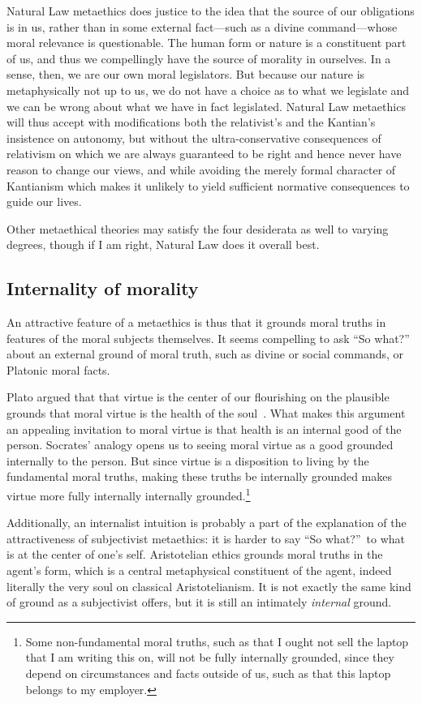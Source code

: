 Natural Law metaethics does justice to the idea that the source of our obligations is in us, rather than in some external fact---such as
a divine command---whose moral relevance is questionable. 
The human form or nature is a constituent part of us, and thus we compellingly have the source of morality in ourselves.
In a sense, then, we are our own moral legislators. But because our nature is metaphysically not
up to us, we do not have a choice as to what we legislate and we can be wrong about what we have in fact legislated. Natural Law
metaethics will thus accept with modifications both the relativist's and the Kantian's insistence on autonomy, but without the
ultra-conservative consequences of relativism on which we are always guaranteed to be right and hence never have reason
to change our views, and while avoiding the merely formal character of Kantianism which makes it unlikely to yield sufficient
normative consequences to guide our lives. 

Other metaethical theories may satisfy the four desiderata as well to varying degrees, though if I am right, Natural 
Law does it overall best.

\subsection{Internality of morality}\label{sec:ethics-internalism}
An attractive feature of a metaethics is thus that it grounds moral truths in features of the moral subjects themselves. It seems 
compelling to ask ``So what?'' about an external ground of moral truth, such as divine or social commands, or Platonic 
moral facts. 

Plato argued that that virtue is the center of our flourishing on the plausible grounds that moral virtue is the health 
of the soul~\parencite[\textit{Republic}, 444e]{PlatoRepublic}. What makes this argument an appealing invitation to moral virtue is that health is an internal good of 
the person. Socrates' analogy opens us to seeing moral virtue as a good grounded internally to the person. But since virtue
is a disposition to living by the fundamental moral truths, making these truths be internally grounded makes virtue
more fully internally internally grounded.\footnote{Some non-fundamental moral truths, such as that I ought not sell
the laptop that I am writing this on, will not be fully internally grounded,
since they depend on circumstances and facts outside of us, such as that this laptop belongs to my employer.}

Additionally, an internalist intuition is probably a part of the explanation of the 
attractiveness of subjectivist metaethics: it is harder to say ``So what?''\ to what is at the center of 
one's self. 
Aristotelian ethics grounds moral truths in the agent's form, which is a central metaphysical constituent of the agent,
indeed literally the very soul on classical Aristotelianism. 
It is not exactly the same kind of ground as a subjectivist offers, but it is still an intimately \textit{internal} ground.

